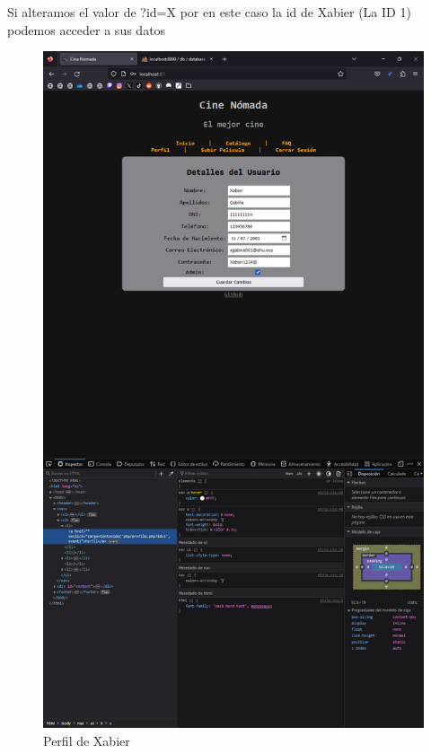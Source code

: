 \documentclass{report}
\begin{document}
                    Si alteramos el valor de ?id=X por en este caso la id de Xabier (La ID 1) podemos acceder a sus datos
                    \begin{figure}[H]
                        \centering
                        \includegraphics[width=\textwidth]{./img/vulnerabilidades/3.1.1.3.png}
                        \caption{Perfil de Xabier}
                    \end{figure}
\end{document}
